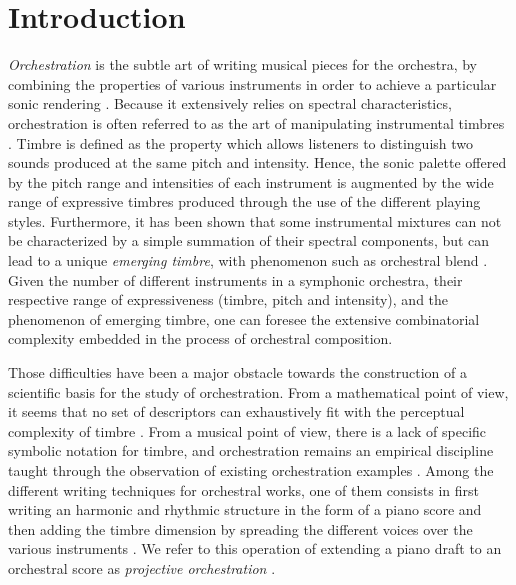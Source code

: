\documentclass{amsart}
\begin{document}
	\section{Introduction}
	\textit{Orchestration} is the subtle art of writing musical pieces for the orchestra, by combining the properties of various instruments in order to achieve a particular sonic rendering \cite{koechli_orch,Rimsky-Korsakov:1873aa}. Because it extensively relies on spectral characteristics, orchestration is often referred to as the art of manipulating instrumental timbres \cite{mcadams2013timbre}. Timbre is defined as the property which allows listeners to distinguish two sounds produced at the same pitch and intensity.
	Hence, the sonic palette offered by the pitch range and intensities of each instrument is augmented by the wide range of expressive timbres produced through the use of the different playing styles.
	Furthermore, it has been shown that some instrumental mixtures can not be characterized by a simple summation of their spectral components, but can lead to a unique \textit{emerging timbre}, with phenomenon such as orchestral blend \cite{tardieu2012perception}.
	Given the number of different instruments in a symphonic orchestra, their respective range of expressiveness (timbre, pitch and intensity), and the phenomenon of emerging timbre, one can foresee the extensive combinatorial complexity embedded in the process of orchestral composition.
	
	Those difficulties have been a major obstacle towards the construction of a scientific basis for the study of orchestration. From a mathematical point of view, it seems that no set of descriptors can exhaustively fit with the perceptual complexity of timbre \cite{peeters2011timbre}. From a musical point of view, there is a lack of specific symbolic notation for timbre, and orchestration remains an empirical discipline taught through the observation of existing orchestration examples \cite{piston-orch}. Among the different writing techniques for orchestral works, one of them consists in first writing an harmonic and rhythmic structure in the form of a piano score and then adding the timbre dimension by spreading the different voices over the various instruments \cite{piston-orch}. We refer to this operation of extending a piano draft to an orchestral score as \textit{projective orchestration} \cite{eslingthesis}.
	
\end{document}
